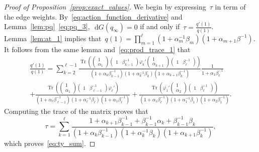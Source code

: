 \documentclass[11pt]{article}
\theoremstyle{plain}
\theoremstyle{definition}
\numberwithin{equation}{section}
\renewcommand{\d}{\,\mathrm{d}}
\DeclareMathOperator{\Tr}{Tr}
\begin{document}
\begin{proof}[Proof of Proposition~\ref{prop:exact_values}]
We begin by expressing~$\tau $ in term of the edge weights. By~\eqref{eq:action_function_derivative} and Lemma~\ref{lem:pq}~\eqref{eq:pq_3},~$\d G(q_\infty)=0$ if and only if~$\tau =\frac{q'(1)}{q(1)}$. Lemma~\ref{lem:at_1} implies that~$q(1)=\prod_{m=1}^\ell(1+\alpha_m^{-1}\beta_m)(1+\alpha_{m+1}\beta^{-1})$.  It follows from the same lemma and~\eqref{eq:prod_trace_1} that
\begin{multline}
\frac{q'(1)}{q(1)}=\sum_{k=2}^{\ell-1} \frac{\Tr\left(
\begin{pmatrix}
1 \\
\alpha_1
\end{pmatrix}
\begin{pmatrix}
1 & \beta_{k-1}^{-1}
\end{pmatrix}
\varphi_k'
\begin{pmatrix}
1 \\
\alpha_{k+1}
\end{pmatrix}
\begin{pmatrix}
1 & \beta_{\ell}^{-1}
\end{pmatrix}\right)}
{(1+\alpha_k\beta_{k-1}^{-1})(1+\alpha_k^{-1}\beta_k)(1+\alpha_{k+1}\beta_k^{-1})}\frac{1}{1+\alpha_1\beta_\ell^{-1}} \\
+\frac{\Tr\left(
\begin{pmatrix}
1 \\
\alpha_1
\end{pmatrix}
\begin{pmatrix}
1 & \beta_{\ell-1}^{-1}
\end{pmatrix}
\varphi_\ell'
\right)}
{(1+\alpha_\ell\beta_{\ell-1}^{-1})(1+\alpha_\ell^{-1}\beta_\ell)(1+\alpha_1\beta_\ell^{-1})} 
+\frac{\Tr\left(
\varphi_1'
\begin{pmatrix}
1 \\
\alpha_{2}
\end{pmatrix}
\begin{pmatrix}
1 & \beta_{\ell}^{-1}
\end{pmatrix}\right)}
{(1+\alpha_1\beta_\ell^{-1})(1+\alpha_1^{-1}\beta_1)(1+\alpha_{2}\beta_1^{-1})}.
\end{multline}
Computing the trace of the matrix proves that
\begin{equation}\label{eq:ty_sum_2}
\tau =
\sum_{k=1}^\ell \frac{1+\alpha_{k+1}\beta_{k-1}^{-1}+\beta_{k-1}^{-1}\alpha_k+\beta_{k-1}^{-1}\beta_k}
{(1+\alpha_k\beta_{k-1}^{-1})(1+\alpha_k^{-1}\beta_k)(1+\alpha_{k+1}\beta_k^{-1})},
\end{equation}
which proves~\eqref{eq:ty_sum}. 


\end{proof}
\end{document}
